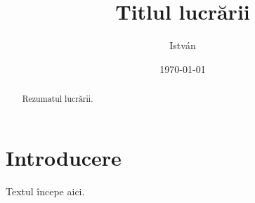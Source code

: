 \documentclass{texign-article}
\title{Titlul lucrării}
\subtitle{}
\author{István}
\date{\today}
\begin{document}
\maketitle

\begin{abstract}
Rezumatul lucrării.
\end{abstract}

\section{Introducere}
Textul începe aici.
\end{document}
